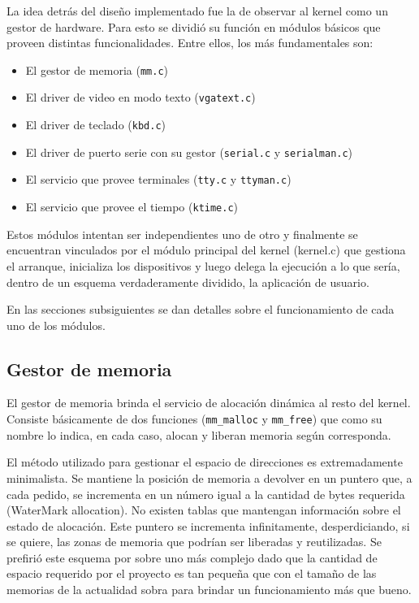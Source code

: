 \documentclass[11pt]{article}
\begin{document}
La idea detrás del diseño implementado fue la de observar al kernel como un gestor de hardware. Para esto se dividió su función en módulos básicos que proveen distintas funcionalidades. Entre ellos, los más fundamentales son:

\begin{itemize}
    \item El gestor de memoria (\texttt{mm.c})
    \item El driver de video en modo texto (\texttt{vgatext.c})
    \item El driver de teclado (\texttt{kbd.c})
    \item El driver de puerto serie con su gestor (\texttt{serial.c} y \texttt{serialman.c})
    \item El servicio que provee terminales (\texttt{tty.c} y \texttt{ttyman.c})
    \item El servicio que provee el tiempo (\texttt{ktime.c})
\end{itemize}

Estos módulos intentan ser independientes uno de otro y finalmente se encuentran vinculados por el módulo principal del kernel (kernel.c) que gestiona el arranque, inicializa los dispositivos y luego delega la ejecución a lo que sería, dentro de un esquema verdaderamente dividido, la aplicación de usuario.

En las secciones subsiguientes se dan detalles sobre el funcionamiento de cada uno de los módulos.

\subsection{Gestor de memoria}

El gestor de memoria brinda el servicio de alocación dinámica al resto del kernel. Consiste básicamente de dos funciones (\texttt{mm\_malloc} y \texttt{mm\_free}) que como su nombre lo indica, en cada caso, alocan y liberan memoria según corresponda.

El método utilizado para gestionar el espacio de direcciones es extremadamente minimalista. Se mantiene la posición de memoria a devolver en un puntero que, a cada pedido, se incrementa en un número igual a la cantidad de bytes requerida (WaterMark allocation). No existen tablas que mantengan información sobre el estado de alocación. Este puntero se incrementa infinitamente, desperdiciando, si se quiere, las zonas de memoria que podrían ser liberadas y reutilizadas. Se prefirió este esquema por sobre uno más complejo dado que la cantidad de espacio requerido por el proyecto es tan pequeña que con el tamaño de las memorias de la actualidad sobra para brindar un funcionamiento más que bueno.
\end{document}
